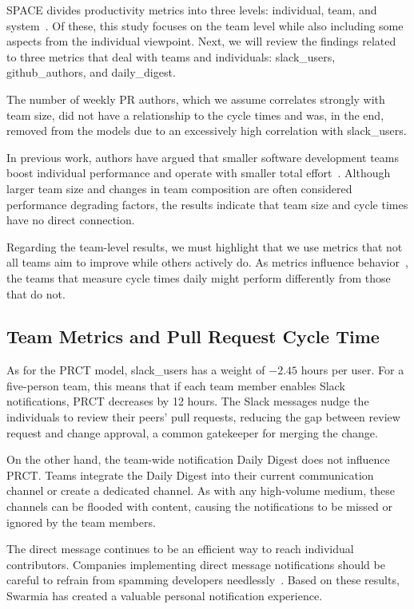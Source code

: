 SPACE divides productivity metrics into three levels: individual, team, and system~\cite{forsgren_space_2021}. Of these, this study focuses on the team level while also including some aspects from the individual viewpoint. Next, we will review the findings related to three metrics that deal with teams and individuals: slack\_users, github\_authors, and daily\_digest.

The number of weekly PR authors, which we assume correlates strongly with team size, did not have a relationship to the cycle times and was, in the end, removed from the models due to an excessively high correlation with slack\_users. 

In previous work, authors have argued that smaller software development teams boost individual performance and operate with smaller total effort~\cite{sutherland_teams_2014, mundra_practical_2013}. Although larger team size and changes in team composition are often considered performance degrading factors, the results indicate that team size and cycle times have no direct connection.

Regarding the team-level results, we must highlight that we use metrics that not all teams aim to improve while others actively do. As metrics influence behavior~\cite{forsgren_space_2021, storey_how_2022}, the teams that measure cycle times daily might perform differently from those that do not. 

\subsection{Team Metrics and Pull Request Cycle Time}

As for the PRCT model, slack\_users has a weight of $-2.45$ hours per user. For a five-person team, this means that if each team member enables Slack notifications, PRCT decreases by 12 hours. The Slack messages nudge the individuals to review their peers' pull requests, reducing the gap between review request and change approval, a common gatekeeper for merging the change. 

On the other hand, the team-wide notification Daily Digest does not influence PRCT. Teams integrate the Daily Digest into their current communication channel or create a dedicated channel. As with any high-volume medium, these channels can be flooded with content, causing the notifications to be missed or ignored by the team members.

The direct message continues to be an efficient way to reach individual contributors. Companies implementing direct message notifications should be careful to refrain from spamming developers needlessly~\cite{maddila_nudge_2022}. Based on these results, Swarmia has created a valuable personal notification experience. 

